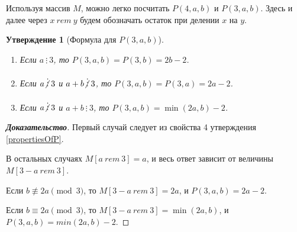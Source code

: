 \documentclass[12pt]{article}
\newtheorem{proposition}[theorem]{Утверждение}
\begin{document}
Используя массив $M$, можно легко посчитать $P(4, a, b)$ и $P(3, a, b)$. Здесь и далее через $x \ rem \ y$ будем обозначать  остаток при делении $x$ на $y$.

\begin{proposition}[Формула для $P(3, a, b)$] { \ }
\begin{enumerate}
\item Если $a \ \vdots \ 3$, то $P(3, a, b) = P(3, b) = 2b - 2$.
\item Если $a \centernot\vdots 3$ и $a + b \centernot\vdots 3$, то $P(3, a, b) = P(3, a) = 2a - 2$.
\item Если $a \centernot\vdots 3$ и $a + b \ \vdots \ 3$, то $P(3, a, b) = \min(2a, b) - 2$.
\end{enumerate}
\end{proposition}
\begin{proof}[\textbf{Доказательство}]
Первый случай следует из свойства 4 утверждения \ref{propertiesOfP}.

В остальных случаях $M[a \ rem \ 3] = a$, и весь ответ зависит от величины $M[3 - a \ rem \ 3]$. 

Если $b \not\equiv 2a \pmod 3$, то $M[3 - a \ rem \ 3] = 2a$, и $P(3, a, b) = 2a - 2$.

Если $b \equiv 2a \pmod 3$, то $M[3 - a \ rem \ 3] = \min(2a, b)$, и $P(3, a, b) = min(2a, b) - 2$.
\end{proof}
\end{document}
